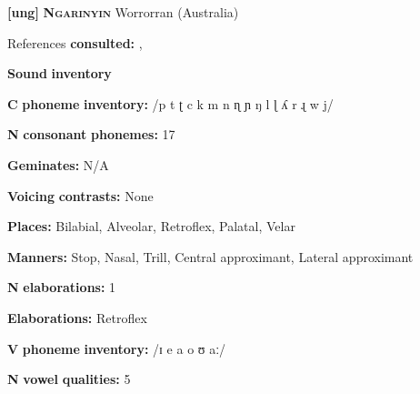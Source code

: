 \documentclass[output=paper]{langsci/langscibook}
\begin{document}
\begin{styleBody}
\textbf{[ung]}   \textbf{\textsc{Ngarinyin}}  Worrorran (Australia)
\end{styleBody}

\begin{styleBody}
References \textbf{consulted:} \citet{CoateOates1970}, \citet{Rumsey1978}
\end{styleBody}

\begin{styleBody}
\textbf{Sound} \textbf{inventory}
\end{styleBody}

\begin{styleBody}
\textbf{C} \textbf{phoneme} \textbf{inventory:} /p t ʈ c k m n ɳ ɲ ŋ l ɭ ʎ r ɻ w j/
\end{styleBody}

\begin{styleBody}
\textbf{N} \textbf{consonant} \textbf{phonemes:} 17
\end{styleBody}

\begin{styleBody}
\textbf{Geminates:} N/A
\end{styleBody}

\begin{styleBody}
\textbf{Voicing} \textbf{contrasts:} None
\end{styleBody}

\begin{styleBody}
\textbf{Places:} Bilabial, Alveolar, Retroflex, Palatal, Velar
\end{styleBody}

\begin{styleBody}
\textbf{Manners:} Stop, Nasal, Trill, Central approximant, Lateral approximant
\end{styleBody}

\begin{styleBody}
\textbf{N} \textbf{elaborations:} 1
\end{styleBody}

\begin{styleBody}
\textbf{Elaborations:} Retroflex
\end{styleBody}

\begin{styleBody}
\textbf{V} \textbf{phoneme} \textbf{inventory:} /ɪ e a o ʊ aː/
\end{styleBody}

\begin{styleBody}
\textbf{N} \textbf{vowel} \textbf{qualities:} 5
\end{styleBody}
\end{document}
